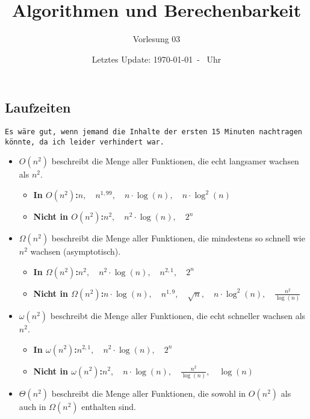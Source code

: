 \documentclass{scrartcl}%
\begin{document}
    \subject{Vorlesungsmitschrieb}
    \title{Algorithmen und Berechenbarkeit}
    \subtitle{Vorlesung 03}
    \date{Letztes Update: \today \ - \currenttime \ Uhr}
    \maketitle

    \subsection*{Laufzeiten}
    \label{subsec:laufzeiten}

    \texttt{Es wäre gut, wenn jemand die Inhalte der ersten 15 Minuten nachtragen könnte, da ich leider verhindert war.}

    \begin{itemize}
        \item $O(n^2)$ beschreibt die Menge aller Funktionen, die echt langsamer wachsen als $n^2$.
        \begin{itemize}
            \item \textbf{In $O(n^2)$:}\quad $n,\quad n^{1,99},\quad n \cdot \log(n),\quad n \cdot \log^2(n)$
            \item \textbf{Nicht in $O(n^2)$:}\quad $n^2,\quad n^2 \cdot \log(n),\quad 2^n$
        \end{itemize}
        \item $\Omega(n^2)$ beschreibt die Menge aller Funktionen, die mindestens so schnell wie $n^2$ wachsen (asymptotisch).
        \begin{itemize}
            \item \textbf{In $\Omega(n^2)$:}\quad $n^2,\quad n^2 \cdot \log(n),\quad n^{2,1},\quad 2^n$
            \item \textbf{Nicht in $\Omega(n^2)$:}\quad $n \cdot \log(n),\quad n^{1,9},\quad \sqrt{n},\quad n \cdot \log^2(n),\quad \frac{n^2}{\log(n)}$
        \end{itemize}
        \item $\omega(n^2)$ beschreibt die Menge aller Funktionen, die echt schneller wachsen als $n^2$.
        \begin{itemize}
            \item \textbf{In $\omega(n^2)$:}\quad $n^{2,1},\quad n^2 \cdot \log(n), \quad 2^n$
            \item \textbf{Nicht in $\omega(n^2)$:}\quad $n^2, \quad n \cdot \log(n), \quad \frac{n^2}{\log(n)}, \quad \log(n)$
        \end{itemize}
        \item $\Theta(n^2)$ beschreibt die Menge aller Funktionen, die sowohl in $O(n^2)$ als auch in $\Omega(n^2)$ enthalten sind.
    \end{itemize}
\end{document}
